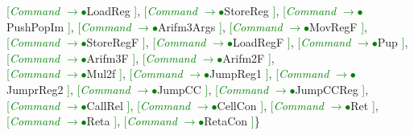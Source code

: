 \documentclass[a0]{a0poster}
\begin{document}
\textcolor{Green}{[}\textcolor{Green}{\textit{Command}} \textcolor{Green}{$\to$}\textcolor{Green}{$\bullet$}LoadReg \textcolor{Green}{]}, \textcolor{Green}{[}\textcolor{Green}{\textit{Command}} \textcolor{Green}{$\to$}\textcolor{Green}{$\bullet$}StoreReg \textcolor{Green}{]}, \textcolor{Green}{[}\textcolor{Green}{\textit{Command}} \textcolor{Green}{$\to$}\textcolor{Green}{$\bullet$}PushPopIm \textcolor{Green}{]}, \textcolor{Green}{[}\textcolor{Green}{\textit{Command}} \textcolor{Green}{$\to$}\textcolor{Green}{$\bullet$}Arifm3Args \textcolor{Green}{]}, \textcolor{Green}{[}\textcolor{Green}{\textit{Command}} \textcolor{Green}{$\to$}\textcolor{Green}{$\bullet$}MovRegF \textcolor{Green}{]}, \textcolor{Green}{[}\textcolor{Green}{\textit{Command}} \textcolor{Green}{$\to$}\textcolor{Green}{$\bullet$}StoreRegF \textcolor{Green}{]}, \textcolor{Green}{[}\textcolor{Green}{\textit{Command}} \textcolor{Green}{$\to$}\textcolor{Green}{$\bullet$}LoadRegF \textcolor{Green}{]}, \textcolor{Green}{[}\textcolor{Green}{\textit{Command}} \textcolor{Green}{$\to$}\textcolor{Green}{$\bullet$}Pup \textcolor{Green}{]}, \textcolor{Green}{[}\textcolor{Green}{\textit{Command}} \textcolor{Green}{$\to$}\textcolor{Green}{$\bullet$}Arifm3F \textcolor{Green}{]}, \textcolor{Green}{[}\textcolor{Green}{\textit{Command}} \textcolor{Green}{$\to$}\textcolor{Green}{$\bullet$}Arifm2F \textcolor{Green}{]},\\
\textcolor{Green}{[}\textcolor{Green}{\textit{Command}} \textcolor{Green}{$\to$}\textcolor{Green}{$\bullet$}Mul2f \textcolor{Green}{]}, \textcolor{Green}{[}\textcolor{Green}{\textit{Command}} \textcolor{Green}{$\to$}\textcolor{Green}{$\bullet$}JumpReg1 \textcolor{Green}{]}, \textcolor{Green}{[}\textcolor{Green}{\textit{Command}} \textcolor{Green}{$\to$}\textcolor{Green}{$\bullet$}JumprReg2 \textcolor{Green}{]}, \textcolor{Green}{[}\textcolor{Green}{\textit{Command}} \textcolor{Green}{$\to$}\textcolor{Green}{$\bullet$}JumpCC \textcolor{Green}{]}, \textcolor{Green}{[}\textcolor{Green}{\textit{Command}} \textcolor{Green}{$\to$}\textcolor{Green}{$\bullet$}JumpCCReg \textcolor{Green}{]}, \textcolor{Green}{[}\textcolor{Green}{\textit{Command}} \textcolor{Green}{$\to$}\textcolor{Green}{$\bullet$}CallRel \textcolor{Green}{]}, \textcolor{Green}{[}\textcolor{Green}{\textit{Command}} \textcolor{Green}{$\to$}\textcolor{Green}{$\bullet$}CellCon \textcolor{Green}{]}, \textcolor{Green}{[}\textcolor{Green}{\textit{Command}} \textcolor{Green}{$\to$}\textcolor{Green}{$\bullet$}Ret \textcolor{Green}{]}, \textcolor{Green}{[}\textcolor{Green}{\textit{Command}} \textcolor{Green}{$\to$}\textcolor{Green}{$\bullet$}Reta \textcolor{Green}{]}, \textcolor{Green}{[}\textcolor{Green}{\textit{Command}} \textcolor{Green}{$\to$}\textcolor{Green}{$\bullet$}RetaCon \textcolor{Green}{]}\}
\end{document}

